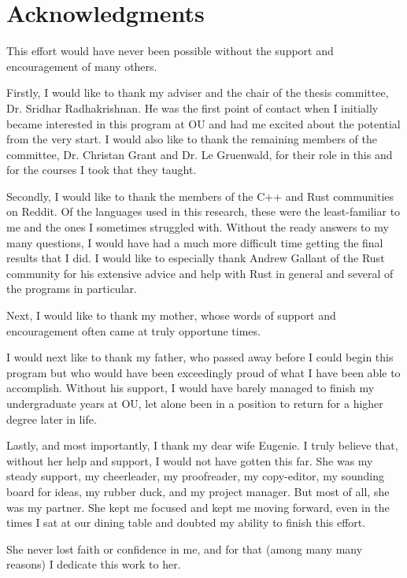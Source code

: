 \section*{Acknowledgments}

This effort would have never been possible without the support and encouragement of many others.

Firstly, I would like to thank my adviser and the chair of the thesis committee, Dr. Sridhar Radhakrishnan. He was the first point of contact when I initially became interested in this program at OU and had me excited about the potential from the very start. I would also like to thank the remaining members of the committee, Dr. Christan Grant and Dr. Le Gruenwald, for their role in this and for the courses I took that they taught.

Secondly, I would like to thank the members of the C++ and Rust communities on Reddit. Of the languages used in this research, these were the least-familiar to me and the ones I sometimes struggled with. Without the ready answers to my many questions, I would have had a much more difficult time getting the final results that I did. I would like to especially thank Andrew Gallant of the Rust community for his extensive advice and help with Rust in general and several of the programs in particular.

Next, I would like to thank my mother, whose words of support and encouragement often came at truly opportune times.

I would next like to thank my father, who passed away before I could begin this program but who would have been exceedingly proud of what I have been able to accomplish. Without his support, I would have barely managed to finish my undergraduate years at OU, let alone been in a position to return for a higher degree later in life.

Lastly, and most importantly, I thank my dear wife Eugenie. I truly believe that, without her help and support, I would not have gotten this far. She was my steady support, my cheerleader, my proofreader, my copy-editor, my sounding board for ideas, my rubber duck, and my project manager. But most of all, she was my partner. She kept me focused and kept me moving forward, even in the times I sat at our dining table and doubted my ability to finish this effort.

She never lost faith or confidence in me, and for that (among many many reasons) I dedicate this work to her.
